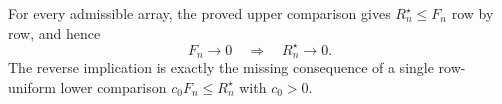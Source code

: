 For every admissible array, the proved upper comparison gives \(R_n^{\star}\le F_n\) row by row, and hence
\[
 F_n\longrightarrow0\quad\Longrightarrow\quad R_n^{\star}\longrightarrow0.
\]
The reverse implication is exactly the missing consequence of a single row-uniform lower comparison \(c_0F_n\le R_n^{\star}\) with \(c_0>0\).